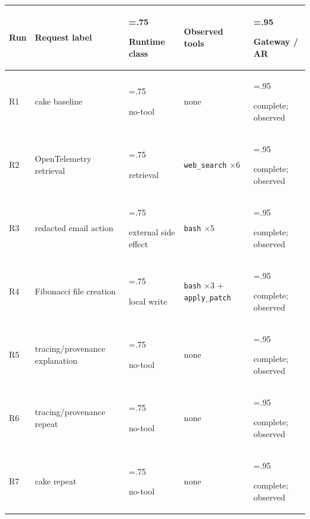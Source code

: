 \begin{tabularx}{\linewidth}{@{}l >{\hsize=1.25\hsize\raggedright\arraybackslash}X >{\hsize=.75\hsize\raggedright\arraybackslash}X >{\hsize=1.05\hsize\raggedright\arraybackslash}X >{\hsize=.95\hsize\raggedright\arraybackslash}X@{}}
\toprule
Run & Request label & Runtime class & Observed tools & Gateway / AR \\
\midrule
R1 & cake baseline & no-tool & none & complete; observed \\
R2 & OpenTelemetry retrieval & retrieval & \texttt{web\_search} \( \times 6 \) & complete; observed \\
R3 & redacted email action & external side effect & \texttt{bash} \( \times 5 \) & complete; observed \\
R4 & Fibonacci file creation & local write & \texttt{bash} \( \times 3 \) + \texttt{apply\_patch} & complete; observed \\
R5 & tracing/provenance explanation & no-tool & none & complete; observed \\
R6 & tracing/provenance repeat & no-tool & none & complete; observed \\
R7 & cake repeat & no-tool & none & complete; observed \\
\bottomrule
\end{tabularx}
